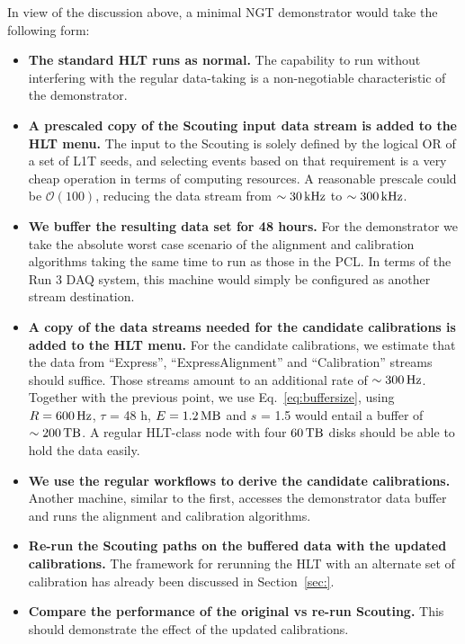 In view of the discussion above, a minimal NGT demonstrator would take the following form:
\begin{itemize}
\item \textbf{The standard HLT runs as normal.} 
The capability to run without interfering with the regular data-taking is
a non-negotiable characteristic of the demonstrator.
\item \textbf{A prescaled copy of the Scouting input data stream is added to the HLT menu.}
The input to the Scouting is solely defined by the logical OR of a set of L1T seeds, and
selecting events based on that requirement is a very cheap operation in terms of computing resources.
A reasonable prescale could be $\mathcal{O}(100)$, reducing the data stream 
from $\sim 30\,\text{kHz}$
to $\sim 300\,\text{kHz}$.
\item \textbf{We buffer the resulting data set for 48 hours.}
For the demonstrator we take the absolute worst case scenario of the alignment and calibration algorithms taking the same time to run as those in the PCL.
In terms of the Run 3 DAQ system, this machine would simply be configured as another stream destination.
\item \textbf{A copy of the data streams needed for the candidate calibrations is added to the HLT menu.}
For the candidate calibrations, we estimate that 
the data from ``Express'', ``ExpressAlignment'' and ``Calibration'' streams should suffice.
Those streams amount to an additional rate of $\sim 300\,\text{Hz}$.
Together with the previous point, we
use Eq.~\ref{eq:buffersize}, using 
$R = 600\,\text{Hz}$,
$\tau$ = 48 h,
$E = 1.2\,\text{MB}$ and
$s$ = 1.5
would entail a buffer of $\sim 200\,\text{TB}$.
A regular HLT-class node with four $60\,\text{TB}$ disks should be able to hold the data easily.
\item \textbf{We use the regular workflows to derive the candidate calibrations.}
Another machine, similar to the first, accesses the demonstrator data buffer
and
runs the alignment and calibration algorithms.
\item \textbf{Re-run the Scouting paths on the buffered data with the updated calibrations.}
The framework for rerunning the HLT with an alternate set of calibration has already been discussed in Section~\ref{sec:}.
\item \textbf{Compare the performance of the original vs re-run Scouting.}
This should demonstrate the effect of the updated calibrations. 
\end{itemize}